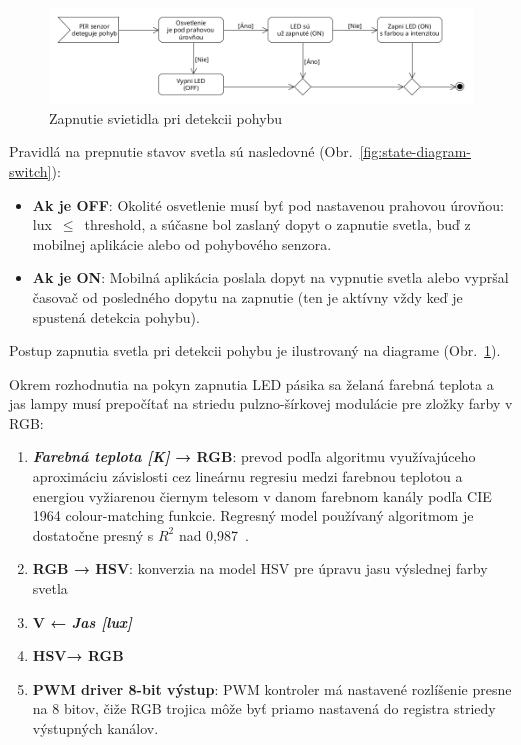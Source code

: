 \documentclass[12pt, a4paper]{article}
\begin{document}
\begin{figure}[h]
   \centering
	\includegraphics[width=\textwidth]{assets/pir-motion-detect.png}
	\caption{Zapnutie svietidla pri detekcii pohybu}
	\label{fig:pir-motion-detect}
\end{figure}

Pravidlá na prepnutie stavov svetla sú nasledovné (Obr.~\ref{fig:state-diagram-switch}):
\begin{itemize}
\item \textbf{Ak je OFF}: Okolité osvetlenie musí byť pod nastavenou prahovou úrovňou: lux~$\leq$~threshold, a súčasne bol zaslaný dopyt o zapnutie svetla, buď z mobilnej aplikácie alebo od pohybového senzora.
\item \textbf{Ak je ON}: Mobilná aplikácia poslala dopyt na vypnutie svetla alebo vypršal časovač od posledného dopytu na zapnutie (ten je aktívny vždy keď je spustená detekcia pohybu).
\end{itemize}
Postup zapnutia svetla pri detekcii pohybu je ilustrovaný na diagrame (Obr.~\ref{fig:pir-motion-detect}).

Okrem rozhodnutia na pokyn zapnutia LED pásika sa želaná farebná teplota a jas lampy musí prepočítať na striedu pulzno-šírkovej modulácie pre zložky farby v RGB:
\begin{enumerate}
\item \textbf{\emph{Farebná teplota [K]} → RGB}: prevod podľa algoritmu využívajúceho aproximáciu závislosti cez lineárnu regresiu medzi farebnou teplotou a energiou vyžiarenou čiernym telesom v danom farebnom kanály podľa CIE 1964 colour-matching funkcie. Regresný model používaný algoritmom je dostatočne presný s $R^2$ nad 0,987~\cite{helland_how_2012}.
\item \textbf{RGB → HSV}: konverzia na model HSV pre úpravu jasu výslednej farby svetla
\item \textbf{V ← \emph{Jas [lux]}}
\item\textbf{HSV→ RGB}
\item \textbf{PWM driver 8-bit výstup}: PWM kontroler má nastavené rozlíšenie presne na 8 bitov, čiže RGB trojica môže byť priamo nastavená do registra striedy výstupných kanálov.
\end{enumerate}
\end{document}
